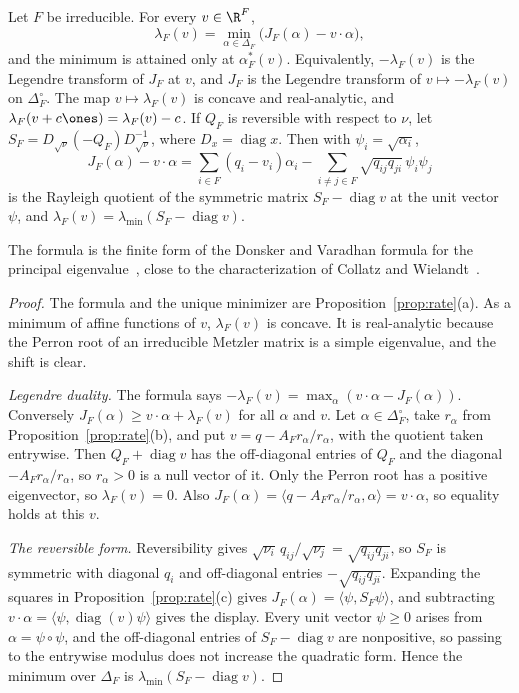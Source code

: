 \begin{proposition}\label{prop:variational}
Let $F$ be irreducible. For every $v\in\R^F$,
\[
 \lambda_F(v)=\min_{\alpha\in\Delta_F}\bigl(J_F(\alpha)-v\cdot\alpha\bigr),
\]
and the minimum is attained only at $\alpha^*_F(v)$. Equivalently, $-\lambda_F(v)$
is the Legendre transform of $J_F$ at $v$, and $J_F$ is the Legendre transform of
$v\mapsto-\lambda_F(v)$ on $\Delta_F^\circ$. The map $v\mapsto\lambda_F(v)$ is
concave and real-analytic, and $\lambda_F(v+c\ones)=\lambda_F(v)-c$. If $Q_F$ is
reversible with respect to $\nu$, let $S_F=D_{\sqrt\nu}(-Q_F)D_{\sqrt\nu}^{-1}$, where $D_x=\operatorname{diag}x$.
Then with $\psi_i=\sqrt{\alpha_i}$,
\[
 J_F(\alpha)-v\cdot\alpha=\sum_{i\in F}(q_i-v_i)\alpha_i-\sum_{i\ne j\in F}\sqrt{q_{ij}q_{ji}}\,\psi_i\psi_j
\]
is the Rayleigh quotient of the symmetric matrix $S_F-\operatorname{diag}v$ at the
unit vector $\psi$, and $\lambda_F(v)=\lambda_{\min}(S_F-\operatorname{diag}v)$.
\end{proposition}

The formula is the finite form of the Donsker and Varadhan formula for the
principal eigenvalue~\cite{dv1975}, close to the characterization of Collatz and
Wielandt~\cite[Ch.~2]{bermanplemmons1994}.

\begin{proof}
The formula and the unique minimizer are Proposition~\ref{prop:rate}(a). As a
minimum of affine functions of $v$, $\lambda_F(v)$ is concave. It is
real-analytic because the Perron root of an irreducible Metzler matrix is a simple
eigenvalue, and the shift is clear.

\emph{Legendre duality.} The formula says
$-\lambda_F(v)=\max_\alpha(v\cdot\alpha-J_F(\alpha))$. Conversely
$J_F(\alpha)\ge v\cdot\alpha+\lambda_F(v)$ for all $\alpha$ and $v$. Let
$\alpha\in\Delta_F^\circ$, take $r_\alpha$ from Proposition~\ref{prop:rate}(b), and
put $v=q-A_Fr_\alpha/r_\alpha$, with the quotient taken entrywise. Then $Q_F+\operatorname{diag}v$ has the
off-diagonal entries of $Q_F$ and the diagonal $-A_Fr_\alpha/r_\alpha$, so
$r_\alpha>0$ is a null vector of it. Only the Perron root has a positive
eigenvector, so $\lambda_F(v)=0$. Also $J_F(\alpha)=\langle q-A_Fr_\alpha/r_\alpha,\alpha\rangle
=v\cdot\alpha$, so equality holds at this $v$.

\emph{The reversible form.} Reversibility gives
$\sqrt{\nu_i}\,q_{ij}/\sqrt{\nu_j}=\sqrt{q_{ij}q_{ji}}$, so $S_F$ is symmetric with
diagonal $q_i$ and off-diagonal entries $-\sqrt{q_{ij}q_{ji}}$. Expanding the
squares in Proposition~\ref{prop:rate}(c) gives
$J_F(\alpha)=\langle\psi,S_F\psi\rangle$, and subtracting
$v\cdot\alpha=\langle\psi,\operatorname{diag}(v)\psi\rangle$ gives the display. Every
unit vector $\psi\ge0$ arises from $\alpha=\psi\circ\psi$, and the off-diagonal
entries of $S_F-\operatorname{diag}v$ are nonpositive, so passing to the entrywise
modulus does not increase the quadratic form. Hence the minimum over $\Delta_F$ is
$\lambda_{\min}(S_F-\operatorname{diag}v)$.
\end{proof}

